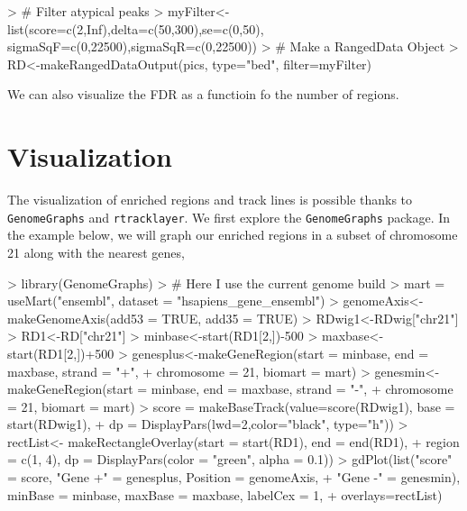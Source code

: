 \documentclass[12pt]{article}
\newcommand{\Rpackage}[1]{\texttt{#1}}
\begin{document}
\begin{Schunk}
\begin{Sinput}
> # Filter atypical peaks
> myFilter<-list(score=c(2,Inf),delta=c(50,300),se=c(0,50), sigmaSqF=c(0,22500),sigmaSqR=c(0,22500))
> # Make a RangedData Object
> RD<-makeRangedDataOutput(pics, type="bed", filter=myFilter)
\end{Sinput}
\end{Schunk}
We can also visualize the FDR as a functioin fo the number of regions.


\section{Visualization}
The visualization of enriched regions and track lines is possible thanks to \Rpackage{GenomeGraphs} and \Rpackage{rtracklayer}.
We first explore the \Rpackage{GenomeGraphs} package. In the example below, we will graph our enriched regions in a subset of chromosome 21 along with the nearest genes, 
\begin{Schunk}
\begin{Sinput}
> library(GenomeGraphs)
> # Here I use the current genome build
> mart = useMart("ensembl", dataset = "hsapiens_gene_ensembl")
> genomeAxis<-makeGenomeAxis(add53 = TRUE, add35 = TRUE)
> RDwig1<-RDwig["chr21"]
> RD1<-RD["chr21"]
> minbase<-start(RD1[2,])-500
> maxbase<-start(RD1[2,])+500
> genesplus<-makeGeneRegion(start = minbase, end = maxbase, strand = "+",
+  chromosome = 21, biomart = mart) 
> genesmin<-makeGeneRegion(start = minbase, end = maxbase, strand = "-", 
+ chromosome = 21, biomart = mart)
> score = makeBaseTrack(value=score(RDwig1), base = start(RDwig1), 
+ dp = DisplayPars(lwd=2,color="black", type="h"))
> rectList<- makeRectangleOverlay(start = start(RD1), end = end(RD1), 
+ region = c(1, 4), dp = DisplayPars(color = "green", alpha = 0.1))
> gdPlot(list("score" = score, "Gene +" = genesplus, Position = genomeAxis, 
+ "Gene -" = genesmin), minBase = minbase, maxBase = maxbase, labelCex = 1,
+ overlays=rectList)
\end{Sinput}
\end{Schunk}
\end{document}
